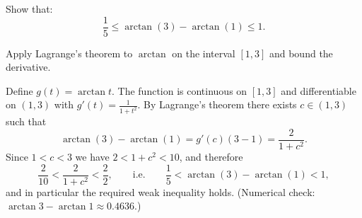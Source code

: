 
\begin{question}
Show that:
\[ \frac15\le \arctan(3)-\arctan(1)\le 1. \]
\end{question}

\begin{hint}
Apply Lagrange's theorem to $\arctan$ on the interval $[1,3]$ and bound the derivative.
\end{hint}

\begin{solution}
Define $g(t)=\arctan t$. The function is continuous on $[1,3]$ and differentiable on $(1,3)$ with $g'(t)=\frac{1}{1+t^2}$. By Lagrange's theorem there exists $c\in(1,3)$ such that
\[ \arctan(3)-\arctan(1)=g'(c)(3-1)=\frac{2}{1+c^2}. \]
Since $1<c<3$ we have $2<1+c^2<10$, and therefore
\[ \frac{2}{10}<\frac{2}{1+c^2}<\frac{2}{2}, \qquad\text{i.e.}\qquad \frac15<\arctan(3)-\arctan(1)<1, \]
and in particular the required weak inequality holds. (Numerical check: $\arctan 3-\arctan 1\approx 0.4636$.)
\end{solution}
